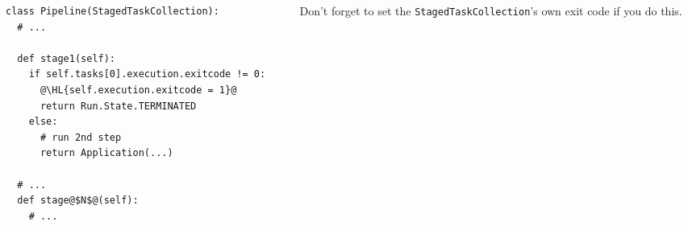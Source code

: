 \documentclass[english,serif,mathserif,xcolor=pdftex,dvipsnames,table]{beamer}
\begin{document}
\begin{frame}[fragile]
  \begin{columns}[c]
    \begin{column}{0.6\textwidth}
      \begin{lstlisting}
class Pipeline(StagedTaskCollection):
  # ...

  def stage1(self):
    if self.tasks[0].execution.exitcode != 0:
      @\HL{self.execution.exitcode = 1}@
      return Run.State.TERMINATED
    else:
      # run 2nd step
      return Application(...)

  # ...
  def stage@$N$@(self):
    # ...
      \end{lstlisting}
    \end{column}
    \begin{column}{0.4\textwidth}
      \raggedleft

      \+\+\+\+\+
      Don't forget to set the \texttt{StagedTaskCollection}'s own exit
      code if you do this.
    \end{column}
  \end{columns}
\end{frame}
\end{document}
